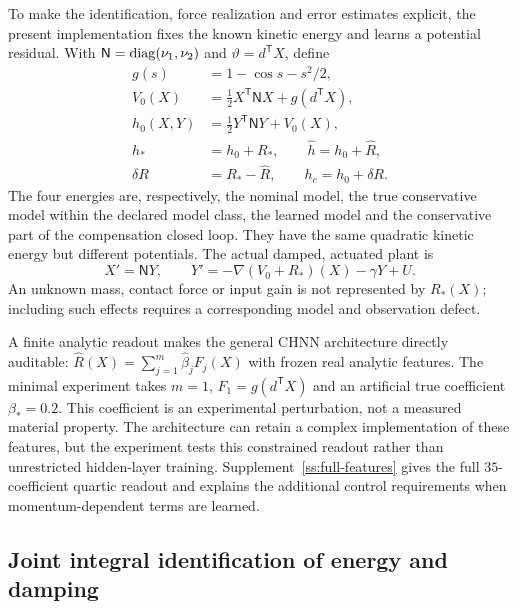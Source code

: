 To make the identification, force realization and error estimates explicit, the present implementation fixes the known kinetic energy and learns a potential residual. With $\mathsf N=\operatorname{diag}(\nu_1,\nu_2)$ and $\vartheta=d^{\mathsf T}X$, define
\begin{equation}\label{struct:objects}
\begin{aligned}
 g(s)&=1-\cos s-s^2/2,\\
 V_0(X)&=\tfrac12X^{\mathsf T}\mathsf N X+g(d^{\mathsf T}X),\\
 h_0(X,Y)&=\tfrac12Y^{\mathsf T}\mathsf N Y+V_0(X),\\
 h_*&=h_0+R_*,\qquad \widehat h=h_0+\widehat R,\\
 \delta R&=R_*-\widehat R,\qquad h_c=h_0+\delta R.
\end{aligned}
\end{equation}
The four energies are, respectively, the nominal model, the true conservative model within the declared model class, the learned model and the conservative part of the compensation closed loop. They have the same quadratic kinetic energy but different potentials. The actual damped, actuated plant is
\begin{equation}\label{struct:plant}
 X'=\mathsf N Y,\qquad
 Y'=-\nabla(V_0+R_*)(X)-\gamma Y+U.
\end{equation}
An unknown mass, contact force or input gain is not represented by $R_*(X)$; including such effects requires a corresponding model and observation defect.

A finite analytic readout makes the general CHNN architecture directly auditable: $\widehat R(X)=\sum_{j=1}^{m}\widehat\beta_jF_j(X)$ with frozen real analytic features. The minimal experiment takes $m=1$, $F_1=g(d^{\mathsf T}X)$ and an artificial true coefficient $\beta_*=0.2$. This coefficient is an experimental perturbation, not a measured material property. The architecture can retain a complex implementation of these features, but the experiment tests this constrained readout rather than unrestricted hidden-layer training. Supplement~\ref{ss:full-features} gives the full $35$-coefficient quartic readout and explains the additional control requirements when momentum-dependent terms are learned.

\subsection{Joint integral identification of energy and damping}
\label{struct:identification-section}


